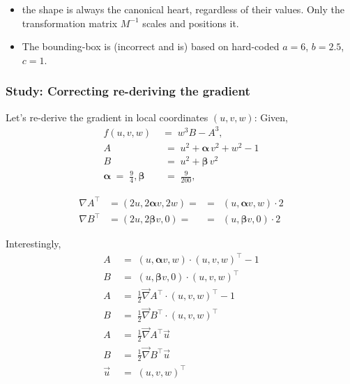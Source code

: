 \documentclass{article}
\begin{document}
\begin{itemize}
  \item the shape is
        always the canonical heart, regardless of their values.
        Only the transformation matrix $M^{-1}$ scales and positions it.
  \item The bounding-box is (incorrect and is) based on hard-coded $a = 6$, $b = 2.5$, $c = 1$.
\end{itemize}


\subsubsection{Study: Correcting re-deriving the gradient}
Let's re-derive the gradient in local coordinates $(u,v,w)$:
Given,
\begin{align}
  f(u,v,w)
  \;&=\;
   w^3 B  - A ^3 ,
  \\
  A &\;=\; u^2 + \bm\alpha\,v^2 + w^2 - 1
  \\
  B &\;=\; u^2 + \bm\beta\,v^2
  \\
  \bm\alpha \;=\; \tfrac{9}{4} ,
  \bm\beta &\;=\; \tfrac{9}{200} ,
\end{align}

\begin{align}
  \nabla A ^\top  &= \left( 2 u, 2 \bm\alpha v, 2 w \right) =&=&  \left( u, \bm\alpha v, w \right) \cdot 2
  \\
  \nabla B ^\top  &= \left( 2 u, 2 \bm\beta v, 0 \right) =&=& \left( u, \bm\beta v, 0 \right) \cdot 2
\end{align}

Interestingly,
\begin{align}
  A &\;=\;  \left( u, \bm\alpha v, w \right) \cdot  \left( u, v, w \right)^\top - 1
  \\
  B &\;=\; \left( u, \bm\beta v, 0 \right) \cdot  \left( u, v, w \right)^\top
  \\[8pt]
  A &\;=\;  \tfrac12 \vec{\nabla} A  ^\top \cdot  \left( u, v, w \right)^\top - 1
  \\
  B &\;=\; \tfrac12 \vec{\nabla} B  ^\top \cdot  \left( u, v, w \right)^\top
  \\[8pt]
  A &\;=\;  \tfrac12 \vec{\nabla} A  ^\top  \vec{u}
  \\
  B &\;=\; \tfrac12 \vec{\nabla} B  ^\top  \vec{u}
  \\
  \vec{u} &\;=\;  \left( u, v, w \right)^\top
\end{align}
\end{document}
